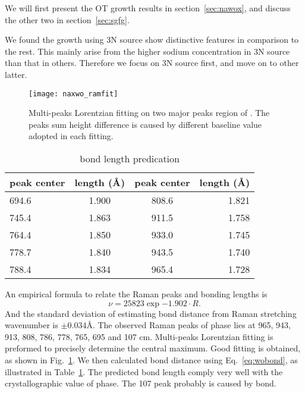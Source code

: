 We will first present the OT growth results in section~\ref{sec:nawox}, and discuss the other two in section~\ref{sec:sgfg}.

We found the growth using 3N source show distinctive features in comparison to the rest. This mainly arise from the higher sodium concentration in 3N source than that in others. Therefore we focus on 3N source first, and move on to other latter.


\begin{figure}[htb]
\centering
\texttt{[image: naxwo\_ramfit]}
\caption[ Raman fitting]{Multi-peaks Lorentzian fitting on two major peaks region of . The peaks sum height difference is caused by different baseline value adopted in each fitting.}
\label{fig:naworamfit}
\end{figure}

\begin{table}[htb]
\centering
\caption{ bond length predication}\label{tab:nawobond}
\begin{tabular}{lccr}
\toprule
peak center & length (\AA) & peak center & length (\AA) \\
\midrule
694.6 & 1.900 &  808.6 &  1.821 \\
745.4 & 1.863 &  911.5 &  1.758 \\
764.4 & 1.850 &  933.0 &  1.745 \\
778.7 & 1.840 &   943.5 & 1.740 \\
788.4 & 1.834 &   965.4 & 1.728 \\
\bottomrule
\end{tabular}
\end{table}

An empirical formula to relate the Raman peaks and  bonding lengths \cite{Hardcastle1995} is
\begin{equation}\label{eq:wobond}
\nu = 25823 \exp{-1.902\cdot R}.
\end{equation}
And the standard deviation of estimating  bond distance from Raman stretching wavenumber is $\pm0.034$\AA.
The observed Raman peaks of  phase lies at 965, 943, 913, 808, 786, 778, 765, 695 and 107 cm. Multi-peaks Lorentzian fitting is preformed to precisely determine the central maximum. Good fitting is obtained, as shown in Fig.~\ref{fig:naworamfit}. We then calculated  bond distance using Eq.~\ref{eq:wobond}, as illustrated in Table~\ref{tab:nawobond}. The predicted  bond length comply very well with the crystallographic value of  phase.\cite{Triantafyllou1999a} The 107 peak probably is caused by  bond.


